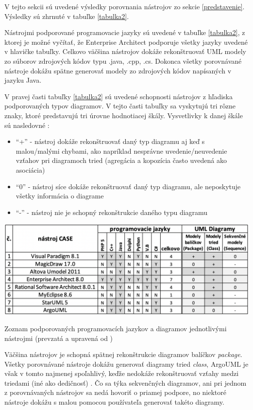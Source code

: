 \documentclass[10pt,twoside,slovak,a4paper]{article}
\begin{document}
V tejto sekcii sú uvedené výsledky porovnania nástrojov zo sekcie \ref{predstavenie}. Výsledky sú zhrnuté v tabuľke \ref{tabulka2}.

Nástrojmi podporované programovacie jazyky sú uvedené v tabuľke \ref{tabulka2}, z ktorej je možné vyčítať, že Enterprise Architect podporuje všetky jazyky uvedené v hlavičke tabuľky. Celkovo väčšina nástrojov dokáže rekonštruovať UML modely zo súborov zdrojových kódov typu .java, .cpp, .cs. Dokonca všetky porovnávané nástroje dokážu spätne generovať modely zo zdrojových kódov napísaných v jazyku Java.

V pravej časti tabuľky \ref{tabulka2} sú uvedené schopnosti nástrojov z hľadiska podporovaných typov diagramov. V tejto časti tabuľky sa vyskytujú tri rôzne znaky, ktoré predstavujú tri úrovne hodnotiacej škály. Vysvetlivky k danej škále sú nasledovné \cite{Osman:RE}:
\begin{itemize}
\item ``+'' - nástroj dokáže rekonštruovať daný typ diagramu aj keď s malou/malými chybami, ako napríklad nesprávne uvedenie/neuvedenie vzťahov pri diagramoch tried (agregácia a kopozícia často uvedená ako asociácia)

\item ``0'' - nástroj síce dokáže rekonštruovať daný typ diagramu, ale neposkytuje všetky informácia o diagrame

\item ``-'' - nástroj nie je schopný rekonštrukcie daného typu diagramu

\end{itemize}

\begin{table}[h]
\centering
\includegraphics[width=1.2\textwidth]{tabulka_nastrojov.png}
\caption{Zoznam podporovaných programovacích jazykov a diagramov jednotlivými nástrojmi (prevzatá a upravená od \cite{Osman:RE})}
\label{tabulka2}
\end{table}
 
 Väčšina nástrojov je schopná spätnej rekonštrukcie diagramov balíčkov \emph{package}. Všetky porovnávané nástroje dokážu generovať diagramy tried \emph{class}, ArgoUML je však v tomto najmenej spoľahlivý, keďže nedokáže rekonštruovať vzťahy medzi triedami (iné ako dedičnosť) \cite{Osman:RE}. Čo sa týka sekvenčných diagramov, ani pri jednom z porovnávaných nástrojov sa nedá hovoriť o priamej podpore, no niektoré nástroje dokážu s malou pomocou používateľa generovať takéto diagramy.
 
\end{document}
